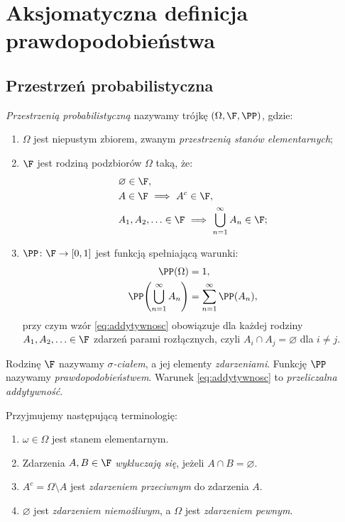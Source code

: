 \chapter{Aksjomatyczna definicja prawdopodobieństwa}
\label{chap:aksjomaty}

\section{Przestrzeń probabilistyczna}
\label{sec:przestrzen}

\begin{definicja}
\emph{Przestrzenią probabilistyczną} nazywamy trójkę
$(\Omega,\F,\PP)$, gdzie:
\begin{enumerate}
  \item $\Omega$ jest niepustym zbiorem, zwanym \emph{przestrzenią
    stanów elementarnych};
  \item $\F$ jest rodziną podzbiorów $\Omega$ taką, że:
    \begin{align*}
      &\varnothing\in\F,\\
      &A\in\F\ \Longrightarrow\ A^c\in\F,\\
      &A_1,A_2,\ldots\in\F\ \Longrightarrow\
        \bigcup_{n=1}^{\infty}A_n\in\F;
    \end{align*}
  \item $\PP\colon\F\to[0,1]$ jest funkcją spełniającą warunki:
    \begin{align}
      \PP(\Omega)&=1,\label{eq:normalizacja}\\
      \PP\!\left(\bigcup_{n=1}^{\infty}A_n\right)
        &=\sum_{n=1}^{\infty}\PP(A_n),
        \label{eq:addytywnosc}
    \end{align}
    przy czym wzór \eqref{eq:addytywnosc} obowiązuje dla każdej
    rodziny $A_1,A_2,\ldots\in\F$ zdarzeń parami rozłącznych, czyli
    $A_i\cap A_j=\varnothing$ dla $i\ne j$.
\end{enumerate}
Rodzinę $\F$ nazywamy \emph{$\sigma$-ciałem}, a jej elementy
\emph{zdarzeniami}. Funkcję $\PP$ nazywamy \emph{prawdopodobieństwem}.
Warunek \eqref{eq:addytywnosc} to \emph{przeliczalna addytywność}.
\end{definicja}

\begin{uwaga}
Przyjmujemy następującą terminologię:
\begin{enumerate}
  \item $\omega\in\Omega$ jest stanem elementarnym.
  \item Zdarzenia $A,B\in\F$ \emph{wykluczają się}, jeżeli
    $A\cap B=\varnothing$.
  \item $A^c=\Omega\setminus A$ jest \emph{zdarzeniem przeciwnym}
    do zdarzenia $A$.
  \item $\varnothing$ jest \emph{zdarzeniem niemożliwym},
    a $\Omega$ jest \emph{zdarzeniem pewnym}.
\end{enumerate}
\end{uwaga}

